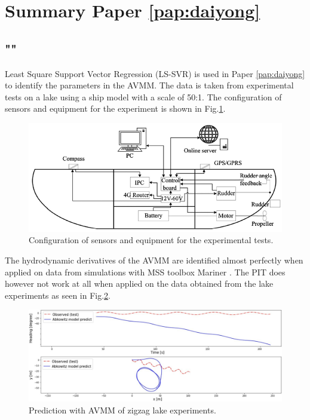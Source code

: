 \section{Summary Paper \ref{pap:daiyong}}
\subsection*{""}
Least Square Support Vector Regression (LS-SVR) \cite{brereton_support_2010} is used in Paper \ref{pap:daiyong} to identify the parameters in the AVMM.  
The data is taken from experimental tests on a lake using a ship model with a scale of 50:1. The configuration of sensors and equipment for the experiment is shown in Fig.\ref{fig:cthmodel}.  
\begin{figure}[H]
    \centering
    \includegraphics[width=\textwidth]{kappa/images/cth_model.png}
    \caption{Configuration of sensors and equipment for the experimental tests.}
    \label{fig:cthmodel}
\end{figure}
\noindent The hydrodynamic derivatives of the AVMM are identified almost perfectly when applied on data from simulations with MSS toolbox Mariner \cite{tristan_matlab_2009}. The PIT does however not work at all when applied on the data obtained from the lake experiments as seen in Fig.\ref{fig:daiyong_extrapolation}. 

\begin{figure}[H]
    \centering
    \includegraphics[width=\linewidth]{kappa/images/daiyong_extrapolation.jpeg}
    \caption{Prediction with AVMM of zigzag lake experiments.}
    \label{fig:daiyong_extrapolation}
\end{figure}


